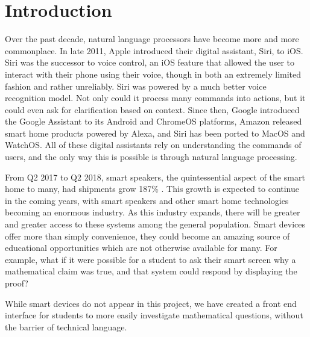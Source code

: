 \chapter{Introduction}

Over the past decade, natural language processors have become more and more commonplace. In late 2011, Apple introduced their digital assistant, Siri, to iOS. Siri was the successor to voice control, an iOS feature that allowed the user to interact with their phone using their voice, though in both an extremely limited fashion and rather unreliably. Siri was powered by a much better voice recognition model. Not only could it process many commands into actions, but it could even ask for clarification based on context. Since then, Google introduced the Google Assistant to its Android and ChromeOS platforms, Amazon released smart home products powered by Alexa, and Siri has been ported to MacOS and WatchOS. All of these digital assistants rely on understanding the commands of users, and the only way this is possible is through natural language processing.                                                                                 
                                                                                                           
From Q2 2017 to Q2 2018, smart speakers, the quintessential aspect of the smart home to many, had shipments grow 187\% \cite{canalys}. This growth is expected to continue in the coming years, with smart speakers and other smart home technologies becoming an enormous industry. As this industry expands, there will be greater and greater access to these systems among the general population. Smart devices offer more than simply convenience, they could become an amazing source of educational opportunities which are not otherwise available for many. For example, what if it were possible for a student to ask their smart screen why a mathematical claim was true, and that system could respond by displaying the proof?                                                 
                                                                                                           
While smart devices do not appear in this project, we have created a front end interface for students to 
more easily investigate mathematical questions, without the barrier of technical language.               
                                                                                                           

